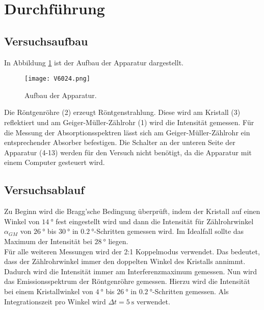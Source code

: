 \documentclass[
  bibliography=totoc,     %
  captions=tableheading,  %
  titlepage=firstiscover, %
]{scrartcl}
\begin{document}
\section{Durchführung}
\label{sec:durchführung}
\subsection{Versuchsaufbau}
\label{sec:aufbau}
In Abbildung \ref{fig:V6024} ist der Aufbau der Apparatur dargestellt.
\begin{figure}[htb]
  \centering
  \texttt{[image: V6024.png]}
  \caption{Aufbau der Apparatur. \cite{anleitung}}
  \label{fig:V6024}
\end{figure}
Die Röntgenröhre (2) erzeugt Röntgenstrahlung. Diese wird am Kristall (3)
reflektiert und am Geiger-Müller-Zählrohr (1) wird die Intensität gemessen.
Für die Messung der Absorptionsspektren lässt sich am Geiger-Müller-Zählrohr
ein entsprechender Absorber befestigen. Die Schalter an der unteren Seite der
Apparatur (4-13) werden für den Versuch nicht benötigt, da die Apparatur mit
einem Computer gesteuert wird.
\subsection{Versuchsablauf}
\label{sec:ablauf}
Zu Beginn wird die Bragg'sche Bedingung überprüft, indem der Kristall auf einen
Winkel von $\SI{14}{\degree}$ fest eingestellt wird und dann die Intensität
für Zählrohrwinkel $\alpha_{GM}$ von $\SI{26}{\degree}$ bis $\SI{30}{\degree}$
in $\SI{0.2}{\degree}$-Schritten gemessen wird. Im Idealfall sollte das Maximum
der Intensität bei $\SI{28}{\degree}$ liegen.\\

\noindent
Für alle weiteren Messungen wird der 2:1 Koppelmodus verwendet.
Das bedeutet, dass der Zählrohrwinkel immer den doppelten Winkel des Kristalls
annimmt. Dadurch wird die Intensität immer am Interferenzmaximum gemessen.
Nun wird das Emissionsspektrum der Röntgenröhre gemessen.
Hierzu wird die Intensität bei einem Kristallwinkel von $\SI{4}{\degree}$ bis
$\SI{26}{\degree}$ in $\SI{0.2}{\degree}$-Schritten gemessen. Als Integrationszeit
pro Winkel wird $\Delta t = \SI{5}{\second}$ verwendet.\\
\end{document}
